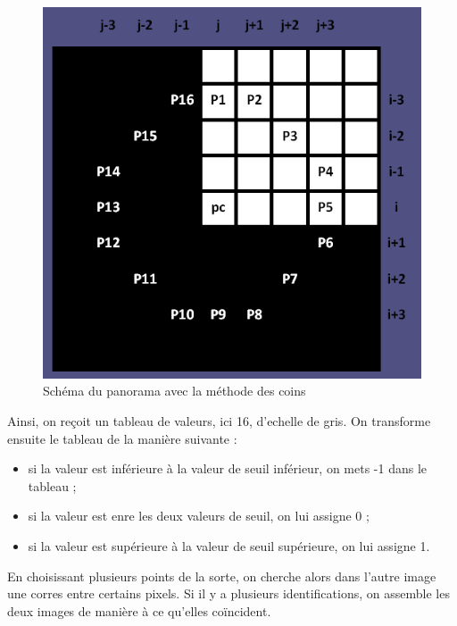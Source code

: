 \documentclass[a4paper,french,12pt]{report}
\begin{document}
		    

		    \begin{figure}[h]
		     \begin{center}
		      \includegraphics[scale=.25]{images/panorama4.png}
		      \caption{Schéma du panorama avec la méthode des coins\cite{operationpixel}}
		     \end{center}
  
		    \end{figure}	    
		    
		    
		    Ainsi, on reçoit un tableau de valeurs, ici 16, d'echelle de gris. On transforme ensuite le tableau de la manière suivante :
		    \begin{itemize}
		     \item si la valeur est inférieure à la valeur de seuil inférieur, on mets -1 dans le tableau ;
		     \item si la valeur est enre les deux valeurs de seuil, on lui assigne 0 ;
		     \item si la valeur est supérieure à la valeur de seuil supérieure, on lui assigne 1.
		    \end{itemize}
		    En choisissant plusieurs points de la sorte, on cherche alors dans l'autre image une corres entre certains pixels. Si il y a plusieurs identifications, on assemble les deux images de manière à ce qu'elles coïncident.
\end{document}

